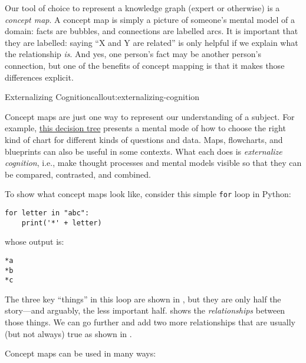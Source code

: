 
Our tool of choice to represent a knowledge graph (expert or
otherwise) is a \emph{concept map}.  A concept map is simply a picture
of someone's mental model of a domain: facts are bubbles, and
connections are labelled arcs. It is important that they are labelled:
saying ``X and Y are related'' is only helpful if we explain what the
relationship \emph{is}. And yes, one person's fact may be another
person's connection, but one of the benefits of concept mapping is
that it makes those differences explicit.

\begin{callout}{Externalizing Cognition}{callout:externalizing-cognition}

Concept maps are just one way to represent our understanding of a
subject.  For example, \href{fixme-abela}{this decision tree} presents
a mental mode of how to choose the right kind of chart for different
kinds of questions and data.  Maps, flowcharts, and blueprints can
also be useful in some contexts.  What each does is \emph{externalize
cognition}, i.e., make thought processes and mental models visible so
that they can be compared, contrasted, and combined.

\end{callout}

To show what concept maps look like, consider this simple \texttt{for}
loop in Python:

\begin{verbatim}
for letter in "abc":
    print('*' + letter)
\end{verbatim}

\noindent
whose output is:

\begin{verbatim}
*a
*b
*c
\end{verbatim}

\noindent
The three key ``things'' in this loop are shown in
,  but they are only half the
story---and arguably, the less important half.
 shows the \emph{relationships} between
those things.  We can go further and add two more relationships that are
usually (but not always) true as shown in
.

Concept maps can be used in many ways:

